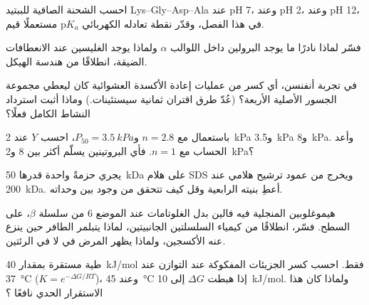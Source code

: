 \begin{exercise}[$\star\star$]\label{exo:b1:proteins:5}
احسب الشحنة الصافية للببتيد Lys--Gly--Asp--Ala عند pH 7، وعند pH 2،
وعند pH 12، مستعملًا قيم p$K_a$ في هذا الفصل، وقدّر نقطة تعادله
الكهربائي.
\end{exercise}

\begin{exercise}[$\star\star$]\label{exo:b1:proteins:6}
فسّر لماذا نادرًا ما يوجد البرولين داخل اللوالب $\alpha$ ولماذا يوجد
الغليسين عند الانعطافات الضيقة، انطلاقًا من هندسة الهيكل.
\end{exercise}

\begin{exercise}[$\star\star$]\label{exo:b1:proteins:7}
في تجربة أنفنسن، أي كسر من عمليات إعادة الأكسدة العشوائية كان ليعطي
مجموعة الجسور الأصلية الأربعة؟ (عُدّ طرق اقتران ثمانية سيستئينات.)
وماذا أثبت استرداد النشاط الكامل فعلًا؟
\end{exercise}

\begin{exercise}[$\star\star$]\label{exo:b1:proteins:8}
باستعمال  مع $n = 2.8$ و$P_{50} = \qty{3.5}{kPa}$، احسب
$Y$ عند \qty{2}{kPa} و\qty{3.5}{kPa} و\qty{8}{kPa}. وأعد الحساب مع
$n = 1$. فأي البروتينين يسلّم أكثر بين \qty{8}{} و\qty{2}{kPa}؟
\end{exercise}

\begin{exercise}[$\star\star$]\label{exo:b1:proteins:9}
 يجري حزمةً واحدة قدرها \qty{50}{kDa} على هلام SDS ويخرج من
عمود ترشيح هلامي عند \qty{200}{kDa}. أعطِ بنيته الرابعية وقل كيف
تتحقق من وجود  بين وحداته.
\end{exercise}

\begin{exercise}[$\star\star\star$]\label{exo:b1:proteins:10}
هيموغلوبين المنجلية فيه فالين بدل الغلوتامات عند الموضع 6 من سلسلة
$\beta$، على السطح. فسّر، انطلاقًا من كيمياء السلسلتين الجانبيتين،
لماذا يتبلمر  الطافر حين ينزع عنه الأكسجين، ولماذا يظهر
المرض في  لا في الرئتين.
\end{exercise}

\begin{exercise}[$\star\star\star$]\label{exo:b1:proteins:11}
طية مستقرة بمقدار \qty{40}{kJ/mol} فقط. احسب كسر الجزيئات المفكوكة عند
التوازن عند \qty{37}{\celsius} ($K = e^{-\Delta G/RT}$)، وعند
\qty{45}{\celsius} إذا هبطت $\Delta G$ إلى \qty{10}{kJ/mol}. ولماذا
كان هذا الاستقرار الحدي نافعًا ؟
\end{exercise}

